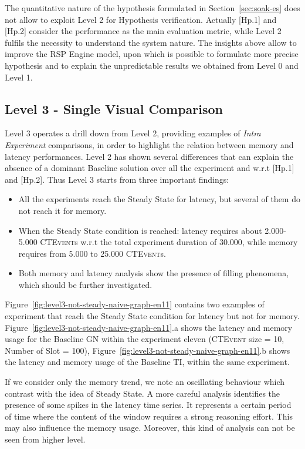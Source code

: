 The quantitative nature of the hypothesis formulated in Section~\ref{sec:soak-es} does not allow to exploit Level 2 for Hypothesis verification. Actually [Hp.1] and [Hp.2] consider the performance as the main evaluation metric, while Level 2 fulfils the necessity to understand the system nature. The insights above allow to improve the RSP Engine model, upon which is possible to formulate more precise hypothesis and to explain the unpredictable results we obtained from Level 0 and Level 1.

\subsection{Level 3 - Single Visual Comparison}\label{sec:eval-level3}
	
Level 3 operates a drill down from Level 2, providing examples of \textit{Intra Experiment} comparisons, in order to highlight the relation between memory and latency performances. Level 2 has shown several differences that can explain the absence of a dominant Baseline solution over all the experiment and w.r.t [Hp.1] and [Hp.2]. Thus Level 3 starts from three important findings:
\begin{itemize}
\item All the experiments reach the Steady State for latency, but several of them do not reach it for memory.
\item When the Steady State condition is reached: latency requires about 2.000-5.000 \textsc{CTEvent}s w.r.t the total experiment duration of 30.000, while memory requires from 5.000 to 25.000 \textsc{CTEvent}s.
\item Both memory and latency analysis show the presence of filling phenomena, which should be further investigated.
\end{itemize}

Figure~\ref{fig:level3-not-steady-naive-graph-en11} contains two examples of experiment that reach the Steady State condition for latency but not for memory. Figure~\ref{fig:level3-not-steady-naive-graph-en11}.a shows the latency and memory usage for the Baseline GN within the experiment eleven (\textsc{CTEvent} size = 10, Number of Slot = 100), Figure~\ref{fig:level3-not-steady-naive-graph-en11}.b shows the latency and memory usage of the Baseline TI, within the same experiment. 

If we consider only the memory trend, we note an oscillating behaviour which contrast with the idea of Steady State. A more careful analysis identifies the presence of some spikes in the latency time series. It represents a certain period of time where the content of the window requires a strong reasoning effort. This may also influence the memory usage. Moreover, this kind of analysis can not be seen from higher level. 

